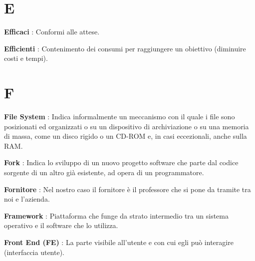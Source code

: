 \documentclass[12pt,a4paper,titlepage]{article}
\begin{document}
\section{E}
\begin{trivlist}
\item \textbf{Efficaci} : Conformi alle attese.
\item \textbf{Efficienti} : Contenimento dei consumi per raggiungere un obiettivo (diminuire costi e tempi).
\end{trivlist}

\section{F}
\begin{trivlist}
\item \textbf{File System} : Indica informalmente un meccanismo con il quale i file sono posizionati ed organizzati o su un dispositivo di archiviazione o su una memoria di massa, come un disco rigido o un CD-ROM e, in casi eccezionali, anche sulla RAM.
\item \textbf{Fork} : Indica lo sviluppo di un nuovo progetto software che parte dal codice sorgente di un altro già esistente, ad opera di un programmatore.
\item \textbf{Fornitore} : Nel nostro caso il fornitore è il professore che si pone da tramite tra noi e l'azienda.
\item \textbf{Framework} : Piattaforma che funge da strato intermedio tra un sistema operativo e il software che lo utilizza.
\item \textbf{Front End (FE)} : La parte visibile all'utente e con cui egli può interagire (interfaccia utente).
\end{trivlist}

\end{document}
